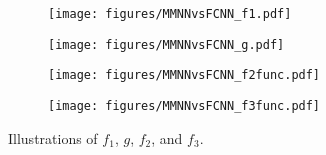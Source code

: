\documentclass[11pt,a4paper]{article}
\begin{document}
\begin{figure}[ht]%
            \centering
  
            \begin{subfigure}[b]{0.72\textwidth}
                    \centering            
                    \texttt{[image: figures/MMNNvsFCNN\_f1.pdf]}
                \end{subfigure}
            \begin{subfigure}[b]{0.27\textwidth}
                    \centering            \texttt{[image: figures/MMNNvsFCNN\_g.pdf]}
                \end{subfigure}
      \begin{subfigure}[b]{0.999\textwidth}
                    \centering            
                    \texttt{[image: figures/MMNNvsFCNN\_f2func.pdf]}
                \end{subfigure}
                      \begin{subfigure}[b]{0.999\textwidth}
                    \centering            
                    \texttt{[image: figures/MMNNvsFCNN\_f3func.pdf]}
                \end{subfigure}
        
\caption{Illustrations of $f_1$, $g$, $f_2$, and $f_3$.}
    \label{fig:fig:f1:g:f2:and:zoomin}   
\end{figure}
\end{document}
